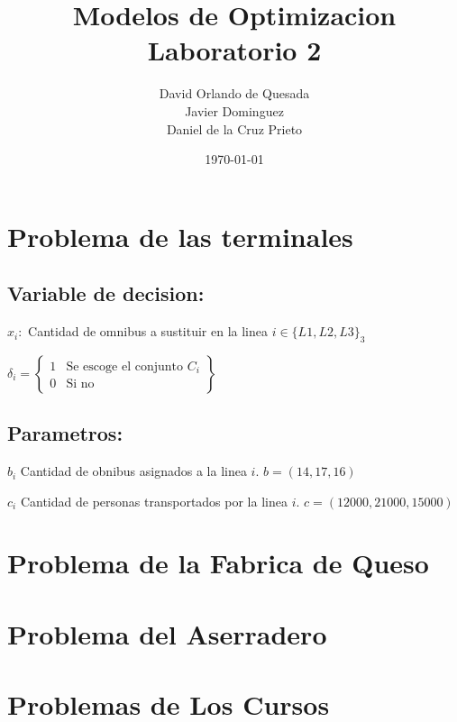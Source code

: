\documentclass[]{article}
\begin{document}
\title{\bf  Modelos de Optimizacion Laboratorio 2}          
\author{David Orlando de Quesada \\ Javier Dominguez \\ Daniel de la Cruz Prieto   }                        
\date{\today} 

\maketitle 


\section{Problema de las terminales }

\subsection{Variable de decision:}

$x_i:$ Cantidad de omnibus a sustituir en la  linea $i \in \{L1,L2,L3\}_3$ 

$
\delta_{i} = 
 \left\{ \begin{array}{cl}
 1 & \mbox{Se escoge el conjunto $C_i$}\\
 0 & \mbox{Si no}
 \end{array}\right\}
$


\subsection{Parametros:}

$b_i$ Cantidad de obnibus asignados a la linea $i$. $ b = \left(14,17,16\right) $  

$c_i$ Cantidad de personas transportados por la linea $i$. $c =\left(12000,21000, 15000\right)$ 

\section{Problema de la Fabrica de  Queso}

\section{Problema del Aserradero} 



\section{Problemas de Los Cursos} 
\end{document}
